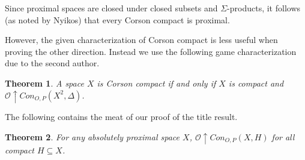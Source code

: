 \documentclass{amsart}
\newtheorem{thm}{Theorem}[section]
\theoremstyle{definition}
\theoremstyle{remark}
\newcommand{\<}{\langle}
\renewcommand{\>}{\rangle}
\newcommand{\congame}[2]{Con_{O,P}(#1,#2)}
\newcommand{\pl}[1]{\mathscr{#1}}
\newcommand{\win}{\uparrow}
\begin{document}
Since proximal spaces are closed under closed subsets and $\Sigma$-products, it follows (as noted by Nyikos) that
every Corson compact is proximal.







However, the given characterization of Corson compact is less useful when proving the other direction.  Instead we use the following game characterization due to the second author.

\begin{thm}\cite{gcovering}
  A space $X$ is Corson compact if and only if $X$ is compact and $\pl O\win\congame{X^2}{\Delta}$.
\end{thm}


The following contains the meat of our proof of the title result.

\begin{thm}
  For any absolutely proximal space $X$, $\pl O\win \congame{X}{H}$ for all compact $H\subseteq X$.
\end{thm}
\end{document}
